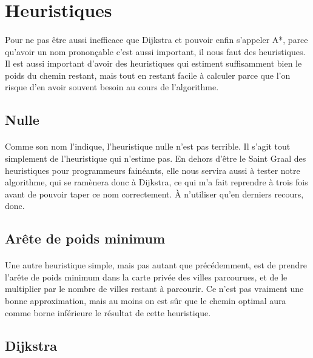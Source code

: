\documentclass[french]{article}
\begin{document}
\section{Heuristiques}\label{sec:modheuristics}

\paragraph{} Pour ne pas être aussi inefficace que Dijkstra et pouvoir enfin
s'appeler A*, parce qu'avoir un nom prononçable c'est aussi important, il nous
faut des heuristiques. Il est aussi important d'avoir des heuristiques qui
estiment suffisamment bien le poids du chemin restant, mais tout en restant
facile à calculer parce que l'on risque d'en avoir souvent besoin au cours de
l'algorithme.

\subsection{Nulle}

\paragraph{} Comme son nom l'indique, l'heuristique nulle n'est pas terrible.
Il s'agit tout simplement de l'heuristique qui n'estime pas. En dehors d'être
le Saint Graal des heuristiques pour programmeurs fainéants, elle nous servira
aussi à tester notre algorithme, qui se ramènera donc à Dijkstra, ce qui m'a
fait reprendre à trois fois avant de pouvoir taper ce nom correctement. À
n'utiliser qu'en derniers recours, donc.

\subsection{Arête de poids minimum}

\paragraph{} Une autre heuristique simple, mais pas autant que précédemment,
est de prendre l'arête de poids minimum dans la carte privée des villes
parcourues, et de le multiplier par le nombre de villes restant à parcourir. Ce
n'est pas vraiment une bonne approximation, mais au moins on est sûr que le
chemin optimal aura comme borne inférieure le résultat de cette heuristique.

\subsection{Dijkstra}
\end{document}
